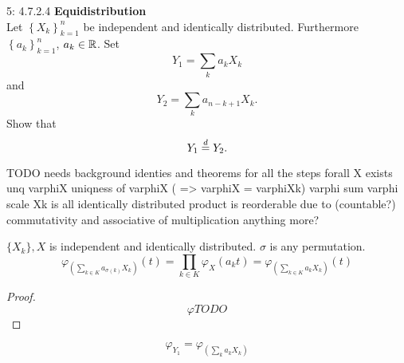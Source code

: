 \documentclass[a4paper,twoside=false,abstract=false,numbers=noenddot,
titlepage=false,headings=small,parskip=half,version=last]{scrartcl}
\begin{document}
\begin{exercise}{5: 4.7.2.4} \textbf{Equidistribution} \\
    Let $\left\{{X_k}\right\}_{k=1}^n$ be independent and identically
    distributed. Furthermore $\left\{{a_k}\right\}_{k=1}^n$, $a_k \in \mathbb{R}$. Set
    \begin{equation}
        Y_1 = \sum\limits_k a_k X_k
    \end{equation}
    and
    \begin{equation}
        Y_2 = \sum\limits_k a_{n-k+1} X_k.
    \end{equation}
    Show that
    \begin{equation}
        Y_1 \stackrel{d}{=} Y_2.
    \end{equation}
\end{exercise}
\begin{solution}
    TODO needs background identies and theorems for all the steps
    forall X exists unq varphiX
    uniqness of varphiX ( => varphiX = varphiXk)
    varphi sum
    varphi scale
    Xk is all identically distributed
    product is reorderable due to (countable?) commutativity and associative of
    multiplication
    anything more?

    \begin{identity}
        \label{thm:permutedcoeffs}
        $\{X_k\}, X$ is independent and identically distributed.
        $\sigma$ is any permutation.
        \begin{equation}
            \varphi_{\left(\sum\limits_{k\in K}a_{\sigma(k)} X_k\right)}(t) =
            \prod\limits_{k\in K} \varphi_X (a_k t) =
            \varphi_{\left(\sum\limits_{k\in K}a_{k} X_k\right)}(t)
        \end{equation}
    \end{identity}
    \begin{proof}
        \begin{equation}
            \varphi TODO
        \end{equation}
    \end{proof}

    \begin{equation}
        \varphi_{Y_1} = \varphi_{\left(\sum\limits_k a_k X_k\right)}
    \end{equation}
\end{solution}
\pagebreak
\end{document}
